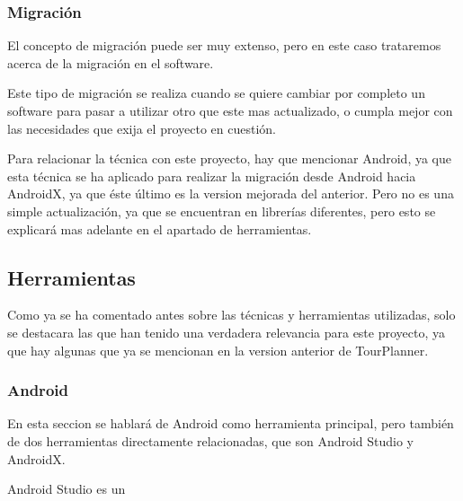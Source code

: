 \subsubsection{Migración}

El concepto de migración puede ser muy extenso, pero en este caso trataremos acerca de la migración en el software.

Este tipo de migración se realiza cuando se quiere cambiar por completo un software para pasar a utilizar otro que este mas actualizado, o cumpla mejor con las necesidades que exija el proyecto en cuestión. 

Para relacionar la técnica con este proyecto, hay que mencionar Android, ya que esta técnica se ha aplicado para realizar la migración desde Android hacia AndroidX, ya que éste último es la version mejorada del anterior. Pero no es una simple actualización, ya que se encuentran en librerías diferentes, pero esto se explicará mas adelante en el apartado de herramientas.


\subsection{Herramientas}

Como ya se ha comentado antes sobre las técnicas y herramientas utilizadas, solo se destacara las que han tenido una verdadera relevancia para este proyecto, ya que hay algunas que ya se mencionan en la version anterior de TourPlanner.

\subsubsection{Android}

En esta seccion se hablará de Android como herramienta principal, pero también de dos herramientas directamente relacionadas, que son Android Studio y AndroidX.

Android Studio es un 




